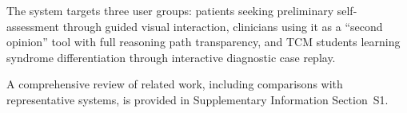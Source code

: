 The system targets three user groups: patients seeking preliminary self-assessment through guided visual interaction, clinicians using it as a ``second opinion'' tool with full reasoning path transparency, and TCM students learning syndrome differentiation through interactive diagnostic case replay.

A comprehensive review of related work, including comparisons with representative systems, is provided in Supplementary Information Section~S1.
